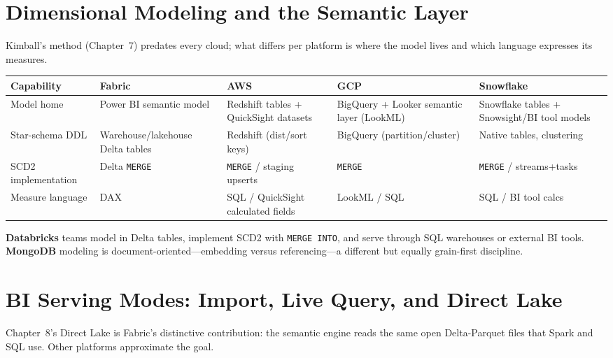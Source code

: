 \section{Dimensional Modeling and the Semantic Layer}
%
Kimball's method (Chapter~7) predates every cloud; what differs per platform is where the
model lives and which language expresses its measures.

\begin{center}
\footnotesize
\begin{tabular}{@{}p{2.8cm}p{3.2cm}p{3.2cm}p{3.2cm}p{3.2cm}@{}}
\toprule
\textbf{Capability} & \textbf{Fabric} & \textbf{AWS} & \textbf{GCP} & \textbf{Snowflake} \\
\midrule
Model home & Power BI semantic model & Redshift tables + QuickSight datasets & BigQuery + Looker semantic layer (LookML) & Snowflake tables + Snowsight/BI tool models \\
Star-schema DDL & Warehouse/lakehouse Delta tables & Redshift (dist/sort keys) & BigQuery (partition/cluster) & Native tables, clustering \\
SCD2 implementation & Delta \texttt{MERGE} & \texttt{MERGE} / staging upserts & \texttt{MERGE} & \texttt{MERGE} / streams+tasks \\
Measure language & DAX & SQL / QuickSight calculated fields & LookML / SQL & SQL / BI tool calcs \\
\bottomrule
\end{tabular}
\end{center}

\noindent \textbf{Databricks} teams model in Delta tables, implement SCD2 with \texttt{MERGE
INTO}, and serve through SQL warehouses or external BI tools. \textbf{MongoDB} modeling is
document-oriented---embedding versus referencing---a different but equally grain-first
discipline.

\section{BI Serving Modes: Import, Live Query, and Direct Lake}
%
Chapter~8's Direct Lake is Fabric's distinctive contribution: the semantic engine reads the
same open Delta-Parquet files that Spark and SQL use. Other platforms approximate the goal.

